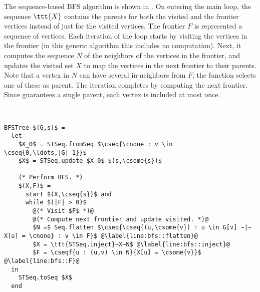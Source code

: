 The sequence-based BFS algorithm is shown in .
%
On entering the main loop, the sequence $\ttt{X}$ contains the parents
for both the visited and the frontier vertices instead of just for the
visited vertices. The frontier $F$ is represented a sequence
of vertices.
%
Each iteration of the loop starts by visiting the vertices in the
frontier (in this generic algorithm this includes no computation). 
%
Next, it computes the sequence $N$ of the neighbors of the vertices in
the frontier, and updates the visited set $X$ to map the vertices in
the next frontier to their parents. Note that a vertex in $N$ can have
several in-neighbors from $F$; the function  selects one of
these as parent.
%
The iteration completes by computing the next frontier.  Since
 guarantees a single parent, each vertex is included
at most once.
%

\begin{algorithm}~
\begin{lstlisting}
BFSTree $(G,s)$ =
  let 
    $X_0$ = STSeq.fromSeq $\cseq{\cnone : v \in \cseq{0,\ldots,|G|-1}}$
    $X$ = STSeq.update $X_0$ $(s,\csome{s})$

    (* Perform BFS. *)
    $(X,F)$ = 
      start $(X,\cseq{s})$ and
      while $(|F| > 0)$ 
        @(* Visit $F$ *)@
        @(* Compute next frontier and update visited. *)@
        $N =$ Seq.flatten $\cseq{\cseq{(u,\csome{v}) : u \in G[v] ~|~ X[u] = \cnone} : v \in F}$ @\label{line:bfs::flatten}@        
        $X = \ttt{STSeq.inject}~X~N$ @\label{line:bfs::inject}@        
        $F = \cseqf{u : (u,v) \in N}{X[u] = \csome{v}}$ @\label{line:bfs::F}@        
  in
    STSeq.toSeq $X$
  end
\end{lstlisting}
\label{alg:bfs::bfs-st}
\end{algorithm}



